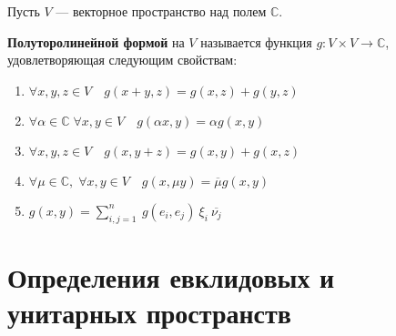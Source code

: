 \clearpage

Пусть $V$ — векторное пространство над полем $\mathbb{C}$.
\vspace{0.5cm}
\begin{shdef}
    \begin{definition}
    \leavevmode \newline
    
    \textbf{Полуторолинейной формой} на $V$ называется функция 
$g: V \times V \to \mathbb{C}$, \newline удовлетворяющая следующим свойствам:
    \begin{enumerate}
        \item $\forall x,y,z \in V \quad g(x + y,z) = g(x,z) + g(y,z)$
        \item $\forall \alpha \in \mathbb{C} \; \forall x,y \in V \quad  g(\alpha x, y) = \alpha g(x,y)$
        \item $\forall x,y,z \in V \quad g(x,y+z) = g(x,y) + g(x,z)$
        \item $\forall \mu \in \mathbb{C}, \; \forall x,y \in V \quad  g(x, \mu y) = \overline{\mu} g(x,y)$
        \item $g(x,y) = \sum_{i,j = 1}^{n} \ g(e_{i}, e_{j}) \ \xi_{i} \ \overline{\nu_{j}}$
    \end{enumerate}
    \end{definition}
\end{shdef}

\vspace{0.5cm}

\section{Определения евклидовых и унитарных пространств}

